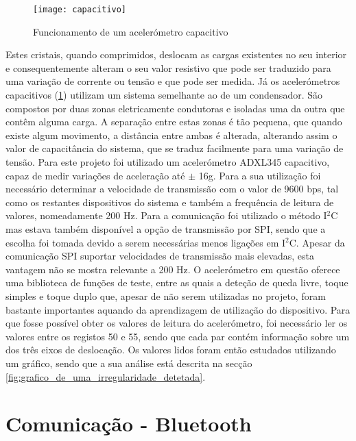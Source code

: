 \begin{figure}[hbtp]
	\centering
	\texttt{[image: capacitivo]}
	\caption[Funcionamento de um acelerómetro capacitivo]{Funcionamento de um acelerómetro capacitivo \footnotemark}
	\label{fig:capacitivo}
\end{figure}

Estes cristais, quando comprimidos, deslocam as cargas existentes no seu interior e consequentemente alteram o seu valor resistivo que pode ser traduzido para uma variação de corrente ou tensão e que pode ser medida.
Já os acelerómetros capacitivos (\ref{fig:capacitivo}) utilizam um sistema semelhante ao de um condensador.
São compostos por duas zonas eletricamente condutoras e isoladas uma da outra que contêm alguma carga.
A separação entre estas zonas é tão pequena, que quando existe algum movimento, a distância entre ambas é alterada, alterando assim o valor de capacitância do sistema, que se traduz facilmente para uma variação de tensão.
Para este projeto foi utilizado um acelerómetro ADXL345 capacitivo, capaz de medir variações de aceleração até  $\pm$ 16g.
Para a sua utilização foi necessário determinar a velocidade de transmissão com o valor de 9600 bps, tal como os restantes dispositivos do sistema e também a frequência de leitura de valores, nomeadamente 200 Hz.
Para a comunicação foi utilizado o método I$^2$C mas estava também disponível a opção de transmissão por SPI, sendo que a escolha foi tomada devido a serem necessárias menos ligações em I$^2$C.
Apesar da comunicação SPI suportar velocidades de transmissão mais elevadas, esta vantagem não se mostra relevante a 200 Hz.
O acelerómetro em questão oferece uma biblioteca de funções de teste, entre as quais a deteção de queda livre, toque simples e toque duplo que, apesar de não serem utilizadas no projeto, foram bastante importantes aquando da aprendizagem de utilização do dispositivo.
Para que fosse possível obter os valores de leitura do acelerómetro, foi necessário ler os valores entre os registos 50 e 55, sendo que cada par contém informação sobre um dos três eixos de deslocação.
Os valores lidos foram então estudados utilizando um gráfico, sendo que a sua análise está descrita na secção \ref{fig:grafico_de_uma_irregularidade_detetada}.

\section{Comunicação - Bluetooth}
\label{sec:bluetooth}

